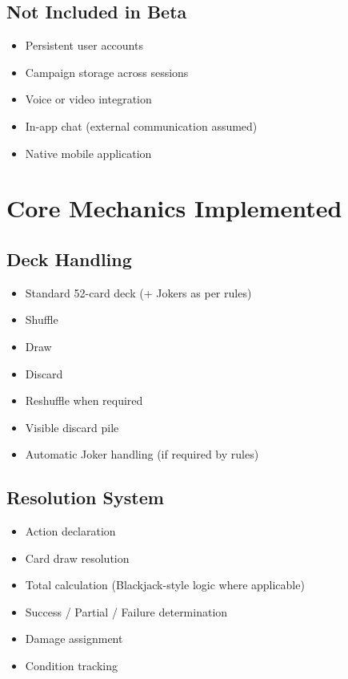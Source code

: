 \documentclass[11pt,a4paper]{article}
\begin{document}
\subsection*{Not Included in Beta}

\begin{itemize}[leftmargin=2em]
    \item Persistent user accounts
    \item Campaign storage across sessions
    \item Voice or video integration
    \item In-app chat (external communication assumed)
    \item Native mobile application
\end{itemize}

\section{Core Mechanics Implemented}

\subsection{Deck Handling}

\begin{itemize}[leftmargin=2em]
    \item Standard 52-card deck (+ Jokers as per rules)
    \item Shuffle
    \item Draw
    \item Discard
    \item Reshuffle when required
    \item Visible discard pile
    \item Automatic Joker handling (if required by rules)
\end{itemize}

\subsection{Resolution System}

\begin{itemize}[leftmargin=2em]
    \item Action declaration
    \item Card draw resolution
    \item Total calculation (Blackjack-style logic where applicable)
    \item Success / Partial / Failure determination
    \item Damage assignment
    \item Condition tracking
\end{itemize}
\end{document}
